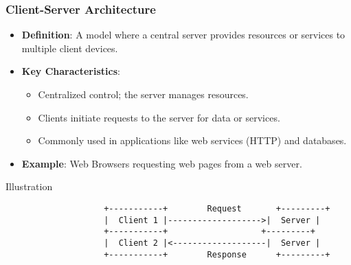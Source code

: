 \documentclass[aspectratio=169]{beamer}
\begin{document}
\begin{frame}[fragile]
    \frametitle{Client-Server Architecture}
    \begin{itemize}
        \item \textbf{Definition}: A model where a central server provides resources or services to multiple client devices.
        \item \textbf{Key Characteristics}:
        \begin{itemize}
            \item Centralized control; the server manages resources.
            \item Clients initiate requests to the server for data or services.
            \item Commonly used in applications like web services (HTTP) and databases.
        \end{itemize}
        \item \textbf{Example}: Web Browsers requesting web pages from a web server.
    \end{itemize}
    
    \begin{block}{Illustration}
        \begin{verbatim}
                    +-----------+        Request       +---------+
                    |  Client 1 |------------------->|  Server |
                    +-----------+                   +---------+
                    |  Client 2 |<-------------------|  Server |
                    +-----------+        Response      +---------+
        \end{verbatim}
    \end{block}
\end{frame}
\end{document}
